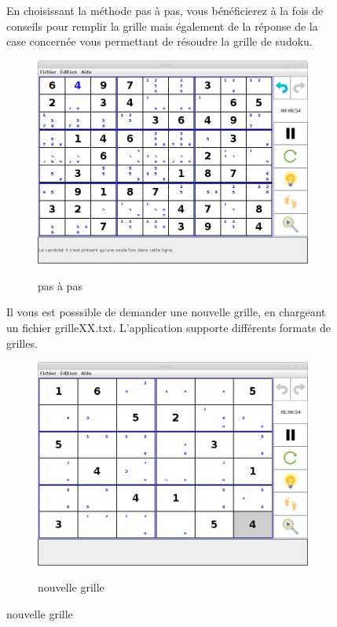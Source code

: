 \begin{figure}[ht]
\newpage
En choisissant la méthode pas à pas, vous bénéficierez à la fois de conseils
pour remplir la grille mais également de la réponse de la case concernée 
vous permettant de résoudre la grille de sudoku. 
\begin{figure}[ht]
  \caption{\label{annexe14} pas à pas}
  \includegraphics [width=130mm]{images/pas.png} \\[0.5cm]
\end{figure}

\newpage
Il vous est posssible de demander une nouvelle grille, en chargeant 
un fichier grilleXX.txt. L'application supporte différents formats de grilles. 
\begin{figure}[ht]
  \caption{\label{annexe15} nouvelle grille}
  \includegraphics [width=130mm]{images/newGrid.png} \\[0.5cm]
\end{figure}


\end{figure}
